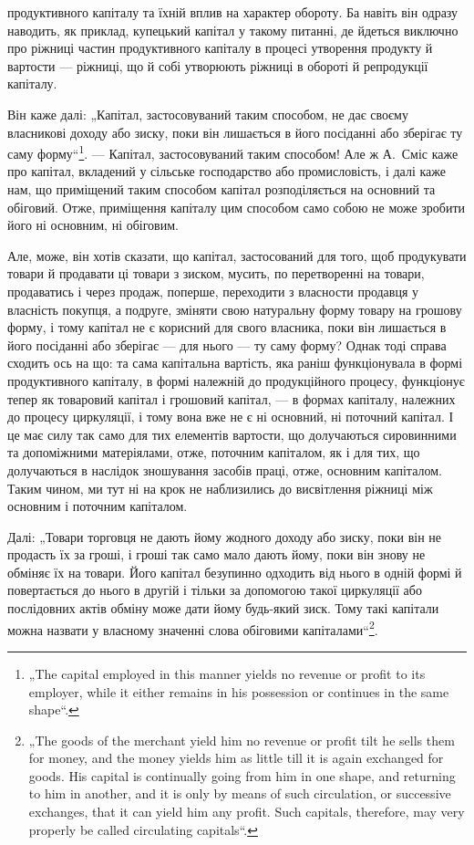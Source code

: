\parcont{}  %
продуктивного капіталу та їхній вплив на характер обороту. Ба навіть
він одразу наводить, як приклад, купецький капітал у такому питанні,
де йдеться виключно про ріжниці частин продуктивного капіталу
в процесі утворення продукту й вартости — ріжниці, що й собі утворюють
ріжниці в обороті й репродукції капіталу.

Він каже далі: „Капітал, застосовуваний таким способом, не дає своєму
власникові доходу або зиску, поки він лишається в його посіданні або
зберігає ту саму форму“\footnote*{
„The capital employed in this manner yields no revenue or profit to its employer,
while it either remains in his possession or continues in the same shape“.
}. — Капітал, застосовуваний таким способом!
Але ж А.~Сміс каже про капітал, вкладений у сільське господарство або
промисловість, і далі каже нам, що приміщений таким способом капітал
розподіляється на основний та обіговий. Отже, приміщення капіталу цим
способом само собою не може зробити його ні основним, ні обіговим.

Але, може, він хотів сказати, що капітал, застосований для того, щоб
продукувати товари й продавати ці товари з зиском, мусить, по перетворенні
на товари, продаватись і через продаж, поперше, переходити з
власности продавця у власність покупця, а подруге, зміняти свою натуральну
форму товару на грошову форму, і тому капітал не є корисний
для свого власника, поки він лишається в його посіданні або зберігає —
для нього — ту саму форму? Однак тоді справа сходить ось на що: та
сама капітальна вартість, яка раніш функціонувала в формі продуктивного
капіталу, в формі належній до продукційного процесу, функціонує
тепер як товаровий капітал і грошовий капітал, — в формах капіталу, належних
до процесу циркуляції, і тому вона вже не є ні основний, ні поточний
капітал. І це має силу так само для тих елементів вартости, що
долучаються сировинними та допоміжними матеріялами, отже, поточним
капіталом, як і для тих, що долучаються в наслідок зношування засобів
праці, отже, основним капіталом. Таким чином, ми тут ні на крок не
наблизились до висвітлення ріжниці між основним і поточним капіталом.

Далі: „Товари торговця не дають йому жодного доходу або зиску,
поки він не продасть їх за гроші, і гроші так само мало дають йому,
поки він знову не обміняє їх на товари. Його капітал безупинно одходить
від нього в одній формі й повертається до нього в другій і тільки
за допомогою такої циркуляції або послідовних актів обміну може дати
йому будь-який зиск. Тому такі капітали можна назвати у власному значенні
слова обіговими капіталами“\footnote*{
„The goods of the merchant yield him no revenue or profit tilt he sells them
for money, and the money yields him as little till it is again exchanged for goods.
His capital is continually going from him in one shape, and returning to him in
another, and it is only by means of such circulation, or successive exchanges, that
it can yield him any profit. Such capitals, therefore, may very properly be called
circulating capitals“.
}.


